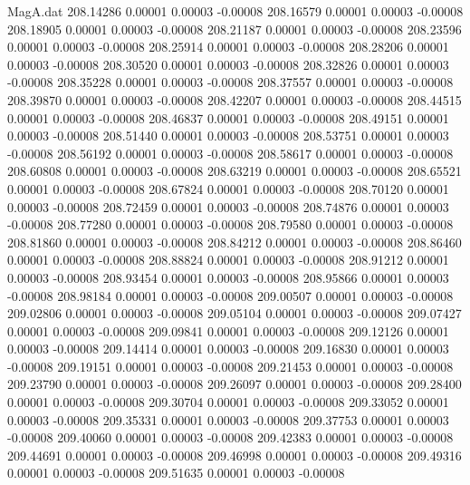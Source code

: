 \begin{filecontents}{MagA.dat}
 208.14286    0.00001    0.00003   -0.00008
 208.16579    0.00001    0.00003   -0.00008
 208.18905    0.00001    0.00003   -0.00008
 208.21187    0.00001    0.00003   -0.00008
 208.23596    0.00001    0.00003   -0.00008
 208.25914    0.00001    0.00003   -0.00008
 208.28206    0.00001    0.00003   -0.00008
 208.30520    0.00001    0.00003   -0.00008
 208.32826    0.00001    0.00003   -0.00008
 208.35228    0.00001    0.00003   -0.00008
 208.37557    0.00001    0.00003   -0.00008
 208.39870    0.00001    0.00003   -0.00008
 208.42207    0.00001    0.00003   -0.00008
 208.44515    0.00001    0.00003   -0.00008
 208.46837    0.00001    0.00003   -0.00008
 208.49151    0.00001    0.00003   -0.00008
 208.51440    0.00001    0.00003   -0.00008
 208.53751    0.00001    0.00003   -0.00008
 208.56192    0.00001    0.00003   -0.00008
 208.58617    0.00001    0.00003   -0.00008
 208.60808    0.00001    0.00003   -0.00008
 208.63219    0.00001    0.00003   -0.00008
 208.65521    0.00001    0.00003   -0.00008
 208.67824    0.00001    0.00003   -0.00008
 208.70120    0.00001    0.00003   -0.00008
 208.72459    0.00001    0.00003   -0.00008
 208.74876    0.00001    0.00003   -0.00008
 208.77280    0.00001    0.00003   -0.00008
 208.79580    0.00001    0.00003   -0.00008
 208.81860    0.00001    0.00003   -0.00008
 208.84212    0.00001    0.00003   -0.00008
 208.86460    0.00001    0.00003   -0.00008
 208.88824    0.00001    0.00003   -0.00008
 208.91212    0.00001    0.00003   -0.00008
 208.93454    0.00001    0.00003   -0.00008
 208.95866    0.00001    0.00003   -0.00008
 208.98184    0.00001    0.00003   -0.00008
 209.00507    0.00001    0.00003   -0.00008
 209.02806    0.00001    0.00003   -0.00008
 209.05104    0.00001    0.00003   -0.00008
 209.07427    0.00001    0.00003   -0.00008
 209.09841    0.00001    0.00003   -0.00008
 209.12126    0.00001    0.00003   -0.00008
 209.14414    0.00001    0.00003   -0.00008
 209.16830    0.00001    0.00003   -0.00008
 209.19151    0.00001    0.00003   -0.00008
 209.21453    0.00001    0.00003   -0.00008
 209.23790    0.00001    0.00003   -0.00008
 209.26097    0.00001    0.00003   -0.00008
 209.28400    0.00001    0.00003   -0.00008
 209.30704    0.00001    0.00003   -0.00008
 209.33052    0.00001    0.00003   -0.00008
 209.35331    0.00001    0.00003   -0.00008
 209.37753    0.00001    0.00003   -0.00008
 209.40060    0.00001    0.00003   -0.00008
 209.42383    0.00001    0.00003   -0.00008
 209.44691    0.00001    0.00003   -0.00008
 209.46998    0.00001    0.00003   -0.00008
 209.49316    0.00001    0.00003   -0.00008
 209.51635    0.00001    0.00003   -0.00008

\end{filecontents}
